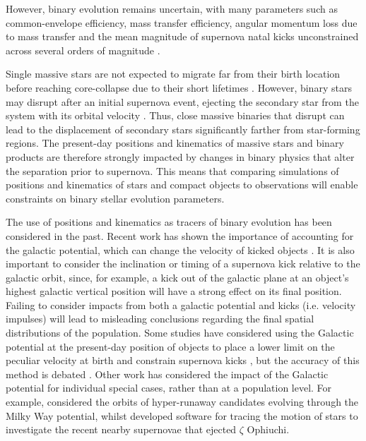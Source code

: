 \documentclass[twocolumn, twocolappendix, oneside, linenumbers]{aastex631}
\begin{document}
However, binary evolution remains uncertain, with many parameters such as common-envelope efficiency, mass transfer efficiency, angular momentum loss due to mass transfer and the mean magnitude of supernova natal kicks unconstrained across several orders of magnitude \citep[e.g.,][]{Janka+2012:2012ARNPS..62..407J,Ivanova+2013, Katsuda+2018,Ivanova+2020:2020cee..book.....I,Ropke+2023:2023LRCA....9....2R, Marchant2023}.

Single massive stars are not expected to migrate far from their birth location before reaching core-collapse due to their short lifetimes \citep[$\lesssim50$\,Myr, e.g., ][]{zapartas:17}. However, binary stars may disrupt after an initial supernova event, ejecting the secondary star from the system with its orbital velocity \citep[e.g.,][]{Blaauw+1961,Eldridge+2011:2011MNRAS.414.3501E,Renzo+2019:2019A&A...624A..66R}. Thus, close massive binaries that disrupt can lead to the displacement of secondary stars significantly farther from star-forming regions. The present-day positions and kinematics of massive stars and binary products are therefore strongly impacted by changes in binary physics that alter the separation prior to supernova. This means that comparing simulations of positions and kinematics of stars and compact objects to observations will enable constraints on binary stellar evolution parameters.

The use of positions and kinematics as tracers of binary evolution has been considered in the past. Recent work has shown the importance of accounting for the galactic potential, which can change the velocity of kicked objects \citep[e.g.,][]{Disberg+2024:2024A&A...687A.272D}. It is also important to consider the inclination or timing of a supernova kick relative to the galactic orbit, since, for example, a kick out of the galactic plane at an object's highest galactic vertical position will have a strong effect on its final position. Failing to consider impacts from both a galactic potential and kicks (i.e. velocity impulses) will lead to misleading conclusions regarding the final spatial distributions of the population. Some studies have considered using the Galactic potential at the present-day position of objects to place a lower limit on the peculiar velocity at birth and constrain supernova kicks \citep{Repetto+2012:2012MNRAS.425.2799R, Repetto+2015:2015MNRAS.453.3341R, Repetto+2017:2017MNRAS.467..298R, atri:19}, but the accuracy of this method is debated \citep{Mandel+2016:2016MNRAS.456..578M}. Other work has considered the impact of the Galactic potential for individual special cases, rather than at a population level. For example, \citet{Evans+2020:2020MNRAS.497.5344E} considered the orbits of hyper-runaway candidates evolving through the Milky Way potential, whilst \citet{Neuhauser+2020:2020MNRAS.498..899N} developed software for tracing the motion of stars to investigate the recent nearby supernovae that ejected $\zeta$ Ophiuchi.
\end{document}
